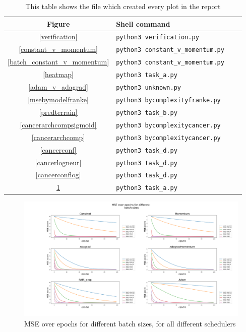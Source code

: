 \documentclass[onecolumn,10pt,cleanfoot]{asme2ej}
\begin{document}
\begin{table}[h]
\caption{This table shows the file which created every plot in the report}
\begin{center}
\label{allparamstable}
\begin{tabular}{c | l l l}
Figure & Shell command \\
\hline
\ref{verification} & \texttt{python3 verification.py}\\
\ref{constant_v_momentum} & \texttt{python3 constant\_v\_momentum.py}\\
\ref{batch_constant_v_momentum} & \texttt{python3 constant\_v\_momentum.py}\\
\ref{heatmap} & \texttt{python3 task\_a.py}\\
\ref{adam_v_adagrad} & \texttt{python3 unknown.py}\\
\ref{msebymodelfranke} & \texttt{python3 bycomplexityfranke.py}\\
\ref{predterrain} & \texttt{python3 task\_b.py}\\
\ref{cancerarchcompsigmoid} & \texttt{python3 bycomplexitycancer.py}\\
\ref{cancerarchcomp} & \texttt{python3 bycomplexitycancer.py}\\
\ref{cancerconf} & \texttt{python3 task\_d.py}\\
\ref{cancerlogneur} & \texttt{python3 task\_d.py}\\
\ref{cancerconflog} & \texttt{python3 task\_d.py}\\
\ref{sgdbatch} & \texttt{python3 task\_a.py}\\
\hline
\end{tabular}
\end{center}
\end{table}

\begin{figure}[H]
\centerline{\includegraphics[width=7in]{figure/SGD_batch_size_100e.png}}
\caption{MSE over epochs for different batch sizes, for all different schedulers}
\label{sgdbatch}
\end{figure}
\end{document}

